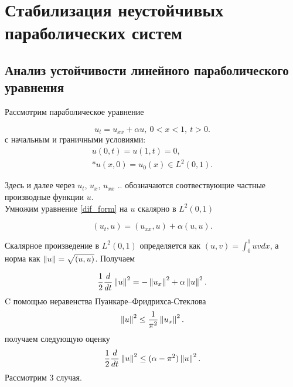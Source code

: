 \section{Стабилизация неустойчивых параболических систем}
\vspace{1em}

\subsection{Анализ устойчивости линейного параболического уравнения}
\vspace{2em}

Рассмотрим параболическое уравнение

\begin{equation}\label{dif_form}
    u_t = u_{xx} + \alpha u, \ 0 < x < 1, \ t > 0.
\end{equation}
с начальным и граничными условиями:
\begin{gather}\label{d_control}
    u(0, t) = u(1, t) = 0, \\*
    u(x, 0) = u_{0}(x) \in L^2(0, 1). \nonumber
\end{gather}

Здесь и далее через $u_t$, $u_x$, $u_{xx}$ .. обозначаются соотвествующие
частные производные функции $u$.\\
Умножим уравнение \eqref{dif_form} на $u$ скалярно в $L^2(0, 1)$

\begin{equation*}
    (u_t, u) = (u_{xx}, u) + \alpha (u, u).
\end{equation*}

Скалярное произведение в $L^2(0, 1)$ определяется как $(u, v) = \int_0^1 uv dx$,
а норма как $\left\lVert u\right\rVert = \sqrt{(u, u)}$. Получаем

\begin{equation}\label{int_form}
    \frac{1}{2}\frac{d}{dt}\left\lVert u\right\rVert^2 = -\left\lVert u_x\right\rVert^2 + \alpha \left\lVert u\right\rVert^2.
\end{equation}
C помощью неравенства Пуанкаре–Фридрихса-Стеклова
\begin{equation*}
    \left\lVert u\right\rVert^2 \le \frac{1}{\pi^2} \left\lVert u_x\right\rVert^2.
\end{equation*}
получаем следующую оценку 
\begin{equation}\label{stable_opr}
    \frac{1}{2}\frac{d}{dt}\left\lVert u\right\rVert^2 \le (\alpha - \pi^2)\left\lVert u\right\rVert^2.
\end{equation}
Рассмотрим 3 случая.

